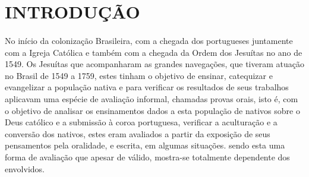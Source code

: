 \section{INTRODUÇÃO}
	\paragraph{}
	    No início da colonização Brasileira, com a chegada dos portugueses juntamente com a Igreja Católica e também com a chegada da Ordem dos Jesuítas no ano de 1549. Os Jesuítas que acompanharam as grandes navegações, que tiveram atuação no Brasil de 1549 a 1759, estes tinham o objetivo de ensinar, catequizar e evangelizar a população nativa e para verificar os resultados de seus trabalhos aplicavam uma espécie de avaliação informal, chamadas provas orais, isto é, com o objetivo de analisar os ensinamentos dados a esta população de nativos sobre o Deus católico e a submissão à coroa portuguesa, verificar a aculturação e a conversão dos nativos, estes eram avaliados a partir da exposição de seus pensamentos pela oralidade, e escrita, em algumas situações. sendo esta uma forma de avaliação que apesar de válido, mostra-se totalmente dependente dos envolvidos. \cite{OLIVEIRA}
